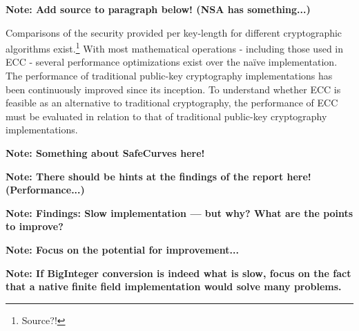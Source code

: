 \textbf{Note: Add source to paragraph below! (NSA has something...)}

Comparisons of the security provided per key-length for different cryptographic algorithms exist.\footnote{Source?!} With
most mathematical operations - including those used in ECC - several performance optimizations exist over the naïve
implementation. The performance of traditional public-key cryptography implementations has been continuously improved
since its inception. To understand whether ECC is feasible as an alternative to traditional cryptography, the performance
of ECC must be evaluated in relation to that of traditional public-key cryptography implementations.

\textbf{Note: Something about SafeCurves here!}

\textbf{Note: There should be hints at the findings of the report here! (Performance...)}

\textbf{Note: Findings: Slow implementation --- but why? What are the points to improve?}

\textbf{Note: Focus on the potential for improvement...}

\textbf{Note: If BigInteger conversion is indeed what is slow, focus on the fact that a native finite field implementation would
solve many problems.}